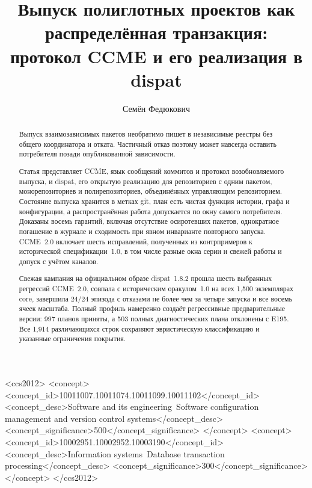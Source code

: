 \documentclass[sigconf,nonacm]{acmart}
\theoremstyle{acmplain}
\theoremstyle{acmdefinition}
\theoremstyle{acmplain}
\begin{document}
\title{Выпуск полиглотных проектов как распределённая транзакция:\\
       протокол CCME и его реализация в dispat}

\author{Семён Федюкович}

\renewcommand{\shortauthors}{Семён Федюкович}

\begin{abstract}
Выпуск взаимозависимых пакетов необратимо пишет в независимые реестры без
общего координатора и отката. Частичный отказ поэтому может навсегда оставить
потребителя позади опубликованной зависимости.

Статья представляет CCME, язык сообщений коммитов и протокол возобновляемого
выпуска, и dispat, его открытую реализацию для репозиториев с одним пакетом,
монорепозиториев и полирепозиториев, объединённых управляющим репозиторием. Состояние
выпуска хранится в метках git, план есть чистая функция истории, графа и
конфигурации, а распространённая работа допускается по окну самого потребителя.
Доказаны восемь гарантий, включая отсутствие осиротевших пакетов, однократное
погашение в журнале и сходимость при явном инварианте повторного запуска.
CCME~2.0 включает шесть исправлений, полученных из контрпримеров к исторической
спецификации~1.0, в том числе разные окна серии и свежей работы и допуск с
учётом каналов.

Свежая кампания на официальном образе dispat~1.8.2 прошла шесть выбранных
регрессий CCME~2.0, совпала с историческим оракулом~1.0 на всех 1{,}500
экземплярах core, завершила 24/24 эпизода с отказами не более чем за четыре
запуска и все восемь ячеек масштаба. Полный профиль намеренно создаёт
регрессивные предварительные версии: 997 планов приняты, а 503 полных
диагностических плана отклонены с E195. Все 1{,}914 различающихся строк
сохраняют эвристическую классификацию и указанные ограничения покрытия.
\end{abstract}

\begin{CCSXML}
<ccs2012>
<concept>
<concept_id>10011007.10011074.10011099.10011102</concept_id>
<concept_desc>Software and its engineering~Software configuration management and version control systems</concept_desc>
<concept_significance>500</concept_significance>
</concept>
<concept>
<concept_id>10002951.10002952.10003190</concept_id>
<concept_desc>Information systems~Database transaction processing</concept_desc>
<concept_significance>300</concept_significance>
</concept>
</ccs2012>
\end{CCSXML}
\end{document}
